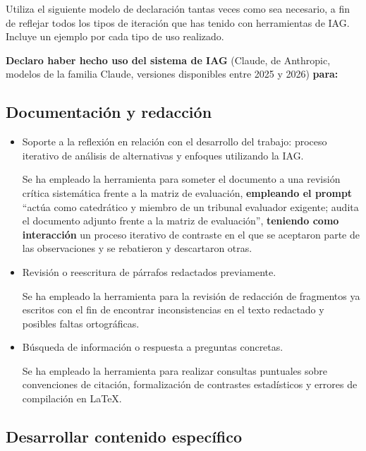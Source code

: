 Utiliza el siguiente modelo de declaración tantas veces como sea necesario, a fin de
reflejar todos los tipos de iteración que has tenido con herramientas de IAG. Incluye un
ejemplo por cada tipo de uso realizado.

\medskip

\noindent\textbf{Declaro haber hecho uso del sistema de IAG} (Claude, de Anthropic, modelos de la
familia Claude, versiones disponibles entre 2025 y 2026) \textbf{para:}

\subsection*{Documentación y redacción}

\begin{itemize}[leftmargin=1.4em]
  \item Soporte a la reflexión en relación con el desarrollo del trabajo: proceso
    iterativo de análisis de alternativas y enfoques utilizando la IAG.

  Se ha empleado la herramienta para someter el documento a una revisión crítica sistemática frente a la matriz de evaluación, \textbf{empleando el prompt} 
  \enquote{actúa como catedrático y miembro de un tribunal evaluador exigente; audita el documento adjunto frente a la matriz de evaluación}, 
  \textbf{teniendo como interacción} un proceso iterativo de contraste en el que se aceptaron parte de las observaciones y se rebatieron y descartaron otras.

  \item Revisión o reescritura de párrafos redactados previamente.

  Se ha empleado la herramienta para la revisión de redacción de fragmentos ya escritos con el fin de encontrar inconsistencias en el texto redactado y posibles faltas ortográficas.

  \item Búsqueda de información o respuesta a preguntas concretas.
  
  Se ha empleado la herramienta para realizar consultas puntuales sobre convenciones de citación, formalización de contrastes estadísticos y errores de compilación en \LaTeX.
\end{itemize}

\subsection*{Desarrollar contenido específico}

